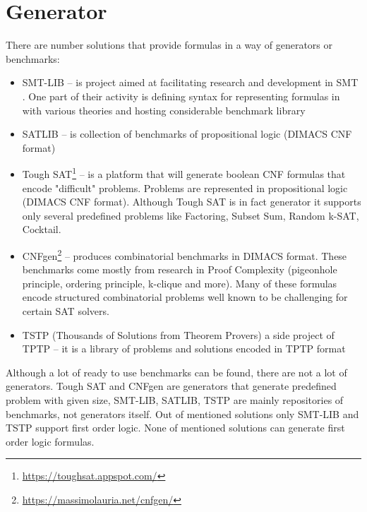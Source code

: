 \chapter{Generator}

There are number solutions that provide formulas in a way of generators or benchmarks:

\begin{itemize}
  \item SMT-LIB \cite{BarFT-RR-17} -- is project aimed at facilitating research and development in \gls{SMT} . One part of their activity is defining syntax for representing formulas in with various theories and hosting considerable benchmark library
  \item SATLIB \cite{Hol00} -- is collection of benchmarks of propositional logic (DIMACS CNF format)
  \item Tough SAT\footnote{\url{https://toughsat.appspot.com/}} -- is a platform that will generate boolean CNF formulas that encode "difficult" problems. Problems are represented in propositional logic (DIMACS CNF format). Although Tough SAT is in fact generator it supports only several predefined problems like Factoring, Subset Sum, Random k-SAT, Cocktail.
  \item CNFgen\footnote{\url{https://massimolauria.net/cnfgen/}} -- produces combinatorial benchmarks in DIMACS format. These benchmarks come mostly from research in Proof Complexity (pigeonhole principle, ordering principle, k-clique and more). Many of these formulas encode structured combinatorial problems well known to be challenging for certain SAT solvers.
  \item TSTP (Thousands of Solutions from Theorem Provers) a side project of \gls{TPTP}\cite{Sut17} -- it is a library of problems and solutions encoded in TPTP format
\end{itemize}

Although a lot of ready to use benchmarks can be found, there are not a lot of generators. Tough SAT and CNFgen are generators that generate predefined problem with given size, SMT-LIB, SATLIB, TSTP are mainly repositories of benchmarks, not generators itself. Out of mentioned solutions only SMT-LIB and TSTP support first order logic. None of mentioned solutions can generate first order logic formulas. 

